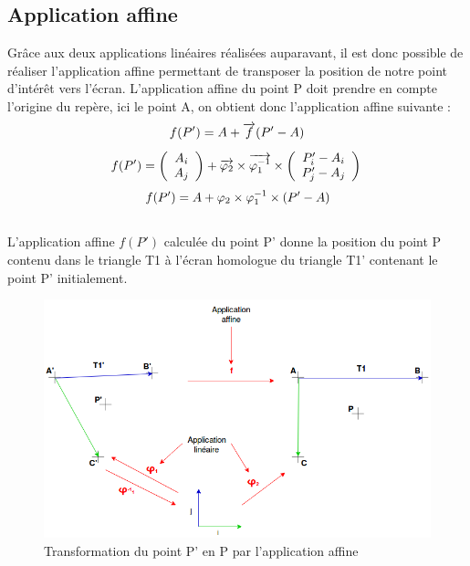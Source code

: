 \documentclass[a4paper, 12pt]{report}
\begin{document}
			\subsection{Application affine}
			Grâce aux deux applications linéaires réalisées auparavant, il est donc possible de réaliser l'application affine permettant de transposer la position de notre point d'intérêt vers l'écran.
			L'application affine du point P doit prendre en compte l'origine du repère, ici le point A, on obtient donc l'application affine suivante :\\
$$
f(P') = A + \overrightarrow{f}(P'-A) \\
$$
$$
f(P') = \left(\begin{array}{c} A _{i} \\ A _{j} \end{array}\right) + \overrightarrow{\varphi _{2}} \times \overrightarrow{\varphi _{1}^{-1}} \times \left(\begin{array}{c} P' _{i} - A _{i} \\ P' _{j} - A _{j} \end{array}\right)
\\
$$
$$
f(P') = A + \varphi _{2} \times \varphi _{1}^{-1} \times (P'-A) \\
\vspace{0.2cm}
\\
$$
\\ L'application  affine $f(P')$ calculée du point P' donne la position du point P contenu dans le triangle T1 à l'écran homologue du triangle T1' contenant le point P' initialement. 
\begin{figure}[!h]
	\includegraphics[scale=0.7]{application_affine.png}
	\caption{Transformation du point P' en P par l'application affine}
	\end{figure}
\end{document}
